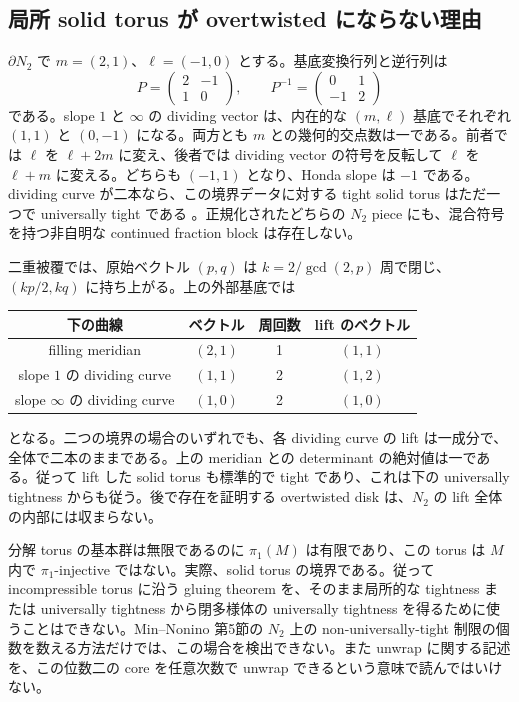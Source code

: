 \documentclass[12pt]{amsart}
\theoremstyle{definition}
\theoremstyle{remark}
\numberwithin{equation}{section}
\theoremstyle{definition}
\begin{document}
\subsection{局所 solid torus が overtwisted にならない理由}
$\partial N_2$ で $m=(2,1)$、$\ell=(-1,0)$ とする。基底変換行列と逆行列は
\begin{equation}\label{ja-basis}
P=\begin{pmatrix}2&-1\\1&0\end{pmatrix},\qquad
P^{-1}=\begin{pmatrix}0&1\\-1&2\end{pmatrix}
\end{equation}
である。slope $1$ と $\infty$ の dividing vector は、内在的な $(m,\ell)$ 基底でそれぞれ $(1,1)$ と $(0,-1)$ になる。両方とも $m$ との幾何的交点数は一である。前者では $\ell$ を $\ell+2m$ に変え、後者では dividing vector の符号を反転して $\ell$ を $\ell+m$ に変える。どちらも $( -1,1)$ となり、Honda slope は $-1$ である。dividing curve が二本なら、この境界データに対する tight solid torus はただ一つで universally tight である \cite[Proposition 5.1(2), $s=-1$ の場合]{ja-Honda}。正規化されたどちらの $N_2$ piece にも、混合符号を持つ非自明な continued fraction block は存在しない。

二重被覆では、原始ベクトル $(p,q)$ は $k=2/\gcd(2,p)$ 周で閉じ、$(kp/2,kq)$ に持ち上がる。上の外部基底では
\begin{center}
\begin{tabular}{cccc}\toprule
下の曲線 & ベクトル & 周回数 & lift のベクトル\\\midrule
filling meridian & $(2,1)$ & 1 & $(1,1)$\\
slope $1$ の dividing curve & $(1,1)$ & 2 & $(1,2)$\\
slope $\infty$ の dividing curve & $(1,0)$ & 2 & $(1,0)$\\\bottomrule
\end{tabular}
\end{center}
となる。二つの境界の場合のいずれでも、各 dividing curve の lift は一成分で、全体で二本のままである。上の meridian との determinant の絶対値は一である。従って lift した solid torus も標準的で tight であり、これは下の universally tightness からも従う。後で存在を証明する overtwisted disk は、$N_2$ の lift 全体の内部には収まらない。

分解 torus の基本群は無限であるのに $\pi_1(M)$ は有限であり、この torus は $M$ 内で $\pi_1$-injective ではない。実際、solid torus の境界である。従って incompressible torus に沿う gluing theorem を、そのまま局所的な tightness または universally tightness から閉多様体の universally tightness を得るために使うことはできない。Min--Nonino 第5節の $N_2$ 上の non-universally-tight 制限の個数を数える方法だけでは、この場合を検出できない。また unwrap に関する記述を、この位数二の core を任意次数で unwrap できるという意味で読んではいけない。
\end{document}
